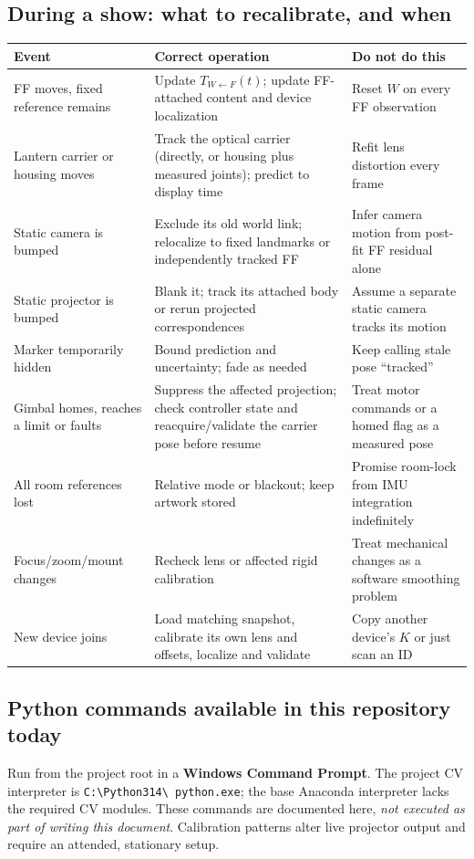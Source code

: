 \documentclass[11pt,a4paper]{article}
\newcommand{\T}[2]{T_{#1\leftarrow #2}}
\begin{document}
\subsection{During a show: what to recalibrate, and when}
\begin{tabularx}{\linewidth}{@{}L{34mm}XX@{}}
\toprule Event & Correct operation & Do not do this\\ \midrule
FF moves, fixed reference remains & Update $\T{W}{F}(t)$; update
FF-attached content and device localization & Reset $W$ on every FF observation\\
Lantern carrier or housing moves & Track the optical carrier (directly, or
housing plus measured joints); predict to display time &
Refit lens distortion every frame\\
Static camera is bumped & Exclude its old world link; relocalize to fixed
landmarks or independently tracked FF & Infer camera motion from post-fit FF
residual alone\\
Static projector is bumped & Blank it; track its attached body or rerun
projected correspondences & Assume a separate static camera tracks its motion\\
Marker temporarily hidden & Bound prediction and uncertainty; fade as needed &
Keep calling stale pose ``tracked''\\
Gimbal homes, reaches a limit or faults & Suppress the affected projection;
check controller state and reacquire/validate the carrier pose before
resume & Treat motor commands or a homed flag as a measured pose\\
All room references lost & Relative mode or blackout; keep artwork stored &
Promise room-lock from IMU integration indefinitely\\
Focus/zoom/mount changes & Recheck lens or affected rigid calibration &
Treat mechanical changes as a software smoothing problem\\
New device joins & Load matching snapshot, calibrate its own lens and offsets,
localize and validate & Copy another device's $K$ or just scan an ID\\
\bottomrule
\end{tabularx}

\subsection{Python commands available in this repository today}
\label{sec:commands}
Run from the project root in a \textbf{Windows Command Prompt}.
The project CV interpreter is \texttt{C:\textbackslash Python314\textbackslash
python.exe}; the base Anaconda interpreter lacks the required CV modules.
These commands are documented here, \emph{not executed as part of writing
this document}. Calibration patterns alter live projector output and
require an attended, stationary setup.
\end{document}
